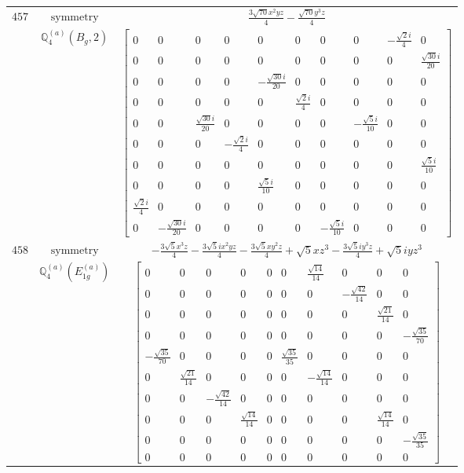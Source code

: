 \documentclass[fleqn,8pt,landscape]{jsarticle}
\begin{document}
\begin{longtable}{ccc}
$ 457 $ & $ \text{symmetry} $ & $ \frac{3 \sqrt{70} x^{2} y z}{4} - \frac{\sqrt{70} y^{3} z}{4} $ \\
$  $ & $ \mathbb{Q}_{4}^{(a)}(B_{g},2) $ & $ \begin{bmatrix} 0 & 0 & 0 & 0 & 0 & 0 & 0 & 0 & - \frac{\sqrt{2} i}{4} & 0 \\ 0 & 0 & 0 & 0 & 0 & 0 & 0 & 0 & 0 & \frac{\sqrt{30} i}{20} \\ 0 & 0 & 0 & 0 & - \frac{\sqrt{30} i}{20} & 0 & 0 & 0 & 0 & 0 \\ 0 & 0 & 0 & 0 & 0 & \frac{\sqrt{2} i}{4} & 0 & 0 & 0 & 0 \\ 0 & 0 & \frac{\sqrt{30} i}{20} & 0 & 0 & 0 & 0 & - \frac{\sqrt{5} i}{10} & 0 & 0 \\ 0 & 0 & 0 & - \frac{\sqrt{2} i}{4} & 0 & 0 & 0 & 0 & 0 & 0 \\ 0 & 0 & 0 & 0 & 0 & 0 & 0 & 0 & 0 & \frac{\sqrt{5} i}{10} \\ 0 & 0 & 0 & 0 & \frac{\sqrt{5} i}{10} & 0 & 0 & 0 & 0 & 0 \\ \frac{\sqrt{2} i}{4} & 0 & 0 & 0 & 0 & 0 & 0 & 0 & 0 & 0 \\ 0 & - \frac{\sqrt{30} i}{20} & 0 & 0 & 0 & 0 & - \frac{\sqrt{5} i}{10} & 0 & 0 & 0 \end{bmatrix} $ \\ \hline
$ 458 $ & $ \text{symmetry} $ & $ - \frac{3 \sqrt{5} x^{3} z}{4} - \frac{3 \sqrt{5} i x^{2} y z}{4} - \frac{3 \sqrt{5} x y^{2} z}{4} + \sqrt{5} x z^{3} - \frac{3 \sqrt{5} i y^{3} z}{4} + \sqrt{5} i y z^{3} $ \\
$  $ & $ \mathbb{Q}_{4}^{(a)}(E_{1g}^{(a)}) $ & $ \begin{bmatrix} 0 & 0 & 0 & 0 & 0 & 0 & \frac{\sqrt{14}}{14} & 0 & 0 & 0 \\ 0 & 0 & 0 & 0 & 0 & 0 & 0 & - \frac{\sqrt{42}}{14} & 0 & 0 \\ 0 & 0 & 0 & 0 & 0 & 0 & 0 & 0 & \frac{\sqrt{21}}{14} & 0 \\ 0 & 0 & 0 & 0 & 0 & 0 & 0 & 0 & 0 & - \frac{\sqrt{35}}{70} \\ - \frac{\sqrt{35}}{70} & 0 & 0 & 0 & 0 & \frac{\sqrt{35}}{35} & 0 & 0 & 0 & 0 \\ 0 & \frac{\sqrt{21}}{14} & 0 & 0 & 0 & 0 & - \frac{\sqrt{14}}{14} & 0 & 0 & 0 \\ 0 & 0 & - \frac{\sqrt{42}}{14} & 0 & 0 & 0 & 0 & 0 & 0 & 0 \\ 0 & 0 & 0 & \frac{\sqrt{14}}{14} & 0 & 0 & 0 & 0 & \frac{\sqrt{14}}{14} & 0 \\ 0 & 0 & 0 & 0 & 0 & 0 & 0 & 0 & 0 & - \frac{\sqrt{35}}{35} \\ 0 & 0 & 0 & 0 & 0 & 0 & 0 & 0 & 0 & 0 \end{bmatrix} $ \\ \hline

\end{longtable}
\end{document}
